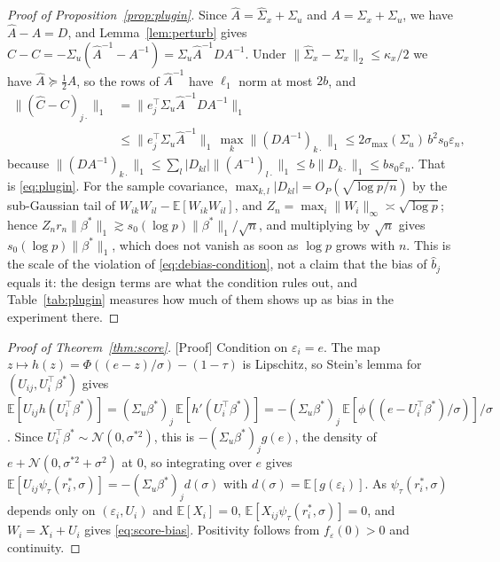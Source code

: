 \documentclass[12pt,a4paper]{article}
\theoremstyle{definition}
\theoremstyle{remark}
\newcommand{\E}{\mathbb{E}}
\newcommand{\cN}{\mathcal{N}}
\newcommand{\psit}{\psi_\tau}
\newcommand{\betas}{\beta^*}
\newcommand{\Ccal}{C}
\begin{document}
\begin{proof}[Proof of Proposition~\ref{prop:plugin}]
Since $\hat A=\hat\Sigma_x+\Sigma_u$ and $A=\Sigma_x+\Sigma_u$, we have
$\hat A-A=D$, and Lemma~\ref{lem:perturb} gives
$\hat\Ccal-\Ccal=-\Sigma_u(\hat A^{-1}-A^{-1})=\Sigma_u\hat A^{-1}DA^{-1}$.
Under $\|\hat\Sigma_x-\Sigma_x\|_2\le\kappa_x/2$ we have $\hat A\succeq\frac12A$, so the
rows of $\hat A^{-1}$ have $\ell_1$ norm at most $2b$, and
\[
\begin{split}
\big\|(\hat\Ccal-\Ccal)_{j\cdot}\big\|_1
&=\big\|e_j^\top\Sigma_u\hat A^{-1}DA^{-1}\big\|_1\\
&\le\big\|e_j^\top\Sigma_u\hat A^{-1}\big\|_1\,
\max_k\big\|(DA^{-1})_{k\cdot}\big\|_1
\le 2\sigma_{\max}(\Sigma_u)\,b^2s_0\varepsilon_n,
\end{split}
\]
because $\|(DA^{-1})_{k\cdot}\|_1\le\sum_l|D_{kl}|\|(A^{-1})_{l\cdot}\|_1
\le b\|D_{k\cdot}\|_1\le bs_0\varepsilon_n$. That is \eqref{eq:plugin}. For the sample
covariance, $\max_{k,l}|D_{kl}|=O_P(\sqrt{\log p/n})$ by the sub-Gaussian tail of
$W_{ik}W_{il}-\E[W_{ik}W_{il}]$, and $Z_n=\max_i\|W_i\|_\infty\asymp\sqrt{\log p}$; hence
$Z_nr_n\|\betas\|_1\gtrsim s_0(\log p)\|\betas\|_1/\sqrt n$, and multiplying by $\sqrt n$
gives $s_0(\log p)\|\betas\|_1$, which does not vanish as soon as $\log p$ grows with $n$.
This is the scale of the violation of \eqref{eq:debias-condition}, not a claim that the bias
of $\hat b_j$ equals it: the design terms are what the condition rules out, and
Table~\ref{tab:plugin} measures how much of them shows up as bias in the experiment there.
\end{proof}

\begin{proof}[Proof of Theorem~\ref{thm:score}]
[Proof]
Condition on $\varepsilon_i=e$. The map
$z\mapsto h(z) = \Phi((e-z)/\sigma)-(1-\tau)$ is Lipschitz, so Stein's lemma for
$(U_{ij},U_i^\top\betas)$ gives
$\E[U_{ij}h(U_i^\top\betas)] = (\Sigma_u\betas)_j\,\E[h'(U_i^\top\betas)]
= -(\Sigma_u\betas)_j\,\E[\phi((e-U_i^\top\betas)/\sigma)]/\sigma$.
Since $U_i^\top\betas\sim\cN(0,\sigma^{*2})$, this is $-(\Sigma_u\betas)_j g(e)$, the
density of $e+\cN(0,\sigma^{*2}+\sigma^2)$ at $0$, so integrating over $e$ gives
$\E[U_{ij}\psit(r_i^*,\sigma)] = -(\Sigma_u\betas)_j d(\sigma)$ with
$d(\sigma) = \E[g(\varepsilon_i)]$. As $\psit(r_i^*,\sigma)$ depends only on
$(\varepsilon_i,U_i)$ and $\E[X_i]=0$, $\E[X_{ij}\psit(r_i^*,\sigma)] = 0$, and
$W_i = X_i+U_i$ gives \eqref{eq:score-bias}. Positivity follows from
$f_\varepsilon(0)>0$ and continuity.
\end{proof}
\end{document}
